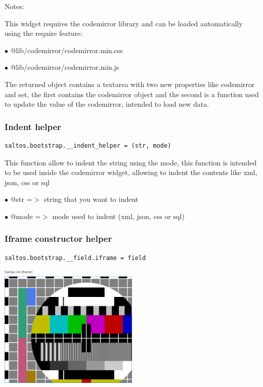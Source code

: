 \documentclass[a4paper]{article}
\begin{document}
Notes:

This widget requires the codemirror library and can be loaded automatically using the require
feature:

\begin{compactitem}
\item[\color{myblue}$\bullet$] @lib/codemirror/codemirror.min.css
\item[\color{myblue}$\bullet$] @lib/codemirror/codemirror.min.js
\end{compactitem}

The returned object contains a textarea with two new properties like codemirror and set,
the first contains the codemirror object and the second is a function used to update the
value of the codemirror, intended to load new data.

\hypertarget{toc61}{}
\subsubsection{Indent helper}

\begin{lstlisting}
saltos.bootstrap.__indent_helper = (str, mode)
\end{lstlisting}

This function allow to indent the string using the mode, this function is
intended to be used inside the codemirror widget, allowing to indent the
contents like xml, json, css or sql

\begin{compactitem}
\item[\color{myblue}$\bullet$] @str  =$>$ string that you want to indent
\item[\color{myblue}$\bullet$] @mode =$>$ mode used to indent (xml, json, css or sql)
\end{compactitem}

\hypertarget{toc62}{}
\subsubsection{Iframe constructor helper}

\begin{lstlisting}
saltos.bootstrap.__field.iframe = field
\end{lstlisting}

\begin{center}\includegraphics[width=0.5\textwidth]{../ujest/snaps/test-bootstrap-js-bootstrap-campo-24-iframe-1-snap.png}\end{center}
\end{document}
